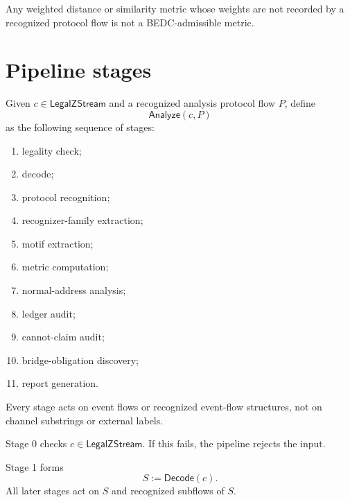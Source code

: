\begin{corollary}
\label{cor:analysis-pipeline-weights-require-protocol}
Any weighted distance or similarity metric whose weights are not recorded by a recognized protocol flow is not a BEDC-admissible metric.
\end{corollary}

\section{Pipeline stages}
\label{sec:analysis-pipeline-stages}

\begin{definition}
\label{def:analysis-pipeline}
Given $c\in\mathsf{LegalZStream}$ and a recognized analysis protocol flow $P$, define
$$
  \mathsf{Analyze}(c,P)
$$
as the following sequence of stages:
\begin{enumerate}
\item legality check;
\item decode;
\item protocol recognition;
\item recognizer-family extraction;
\item motif extraction;
\item metric computation;
\item normal-address analysis;
\item ledger audit;
\item cannot-claim audit;
\item bridge-obligation discovery;
\item report generation.
\end{enumerate}
Every stage acts on event flows or recognized event-flow structures, not on channel substrings or external labels.
\end{definition}

\begin{definition}
\label{def:analysis-pipeline-stage-legality}
Stage 0 checks $c\in\mathsf{LegalZStream}$. If this fails, the pipeline rejects the input.
\end{definition}

\begin{definition}
\label{def:analysis-pipeline-stage-decode}
Stage 1 forms
$$
  S:=\mathsf{Decode}(c).
$$
All later stages act on $S$ and recognized subflows of $S$.
\end{definition}

